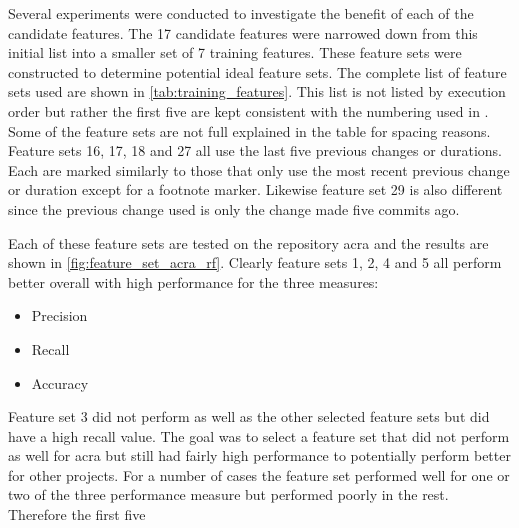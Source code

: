 Several experiments were conducted to investigate the benefit of each of the candidate features. The 17 candidate features were narrowed down from this initial list into a smaller set of 7 training features. These feature sets were constructed to determine potential ideal feature sets. The complete list of feature sets used are shown in \autoref{tab:training_features}. This list is not listed by execution order but rather the first five are kept consistent with the numbering used in . Some of the feature sets are not full explained in the table for spacing reasons. Feature sets 16, 17, 18 and 27 all use the last five previous changes or durations. Each are marked similarly to those that only use the most recent previous change or duration except for a footnote marker. Likewise feature set 29 is also different since the previous change used is only the change made five commits ago.

Each of these feature sets are tested on the repository acra and the results are shown in \autoref{fig:feature_set_acra_rf}. Clearly feature sets 1, 2, 4 and 5 all perform better overall with high performance for the three measures:
\begin{itemize}
\item Precision
\item Recall
\item Accuracy
\end{itemize}
Feature set 3 did not perform as well as the other selected feature sets but did have a high recall value. The goal was to select a feature set that did not perform as well for acra but still had fairly high performance to potentially perform better for other projects. For a number of cases the feature set performed well for one or two of the three performance measure but performed poorly in the rest. Therefore the first five

\renewcommand*{\thefootnote}{\fnsymbol{footnote}}

